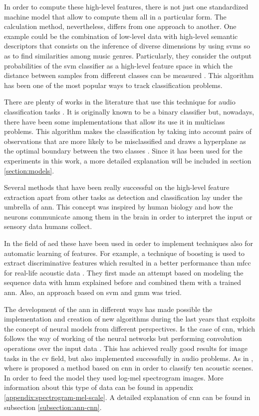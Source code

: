	In order to compute these high-level features, there is not just one standardized machine model that allow to compute them all in a particular form. The calculation method, nevertheless, differs from one approach to another. One example could be the combination of low-level data with high-level semantic descriptors that consists on the inference of diverse dimensions by using \acrlong{svm}s so as to find similarities among music genres. Particularly, they consider the output probabilities of the \acrshort{svm} classifier as a high-level feature space in which the distance between samples from different classes can be measured \cite{Bogdanov2011}. This algorithm has been one of the most popular ways to track classification problems.
	 
	There are plenty of works in the literature that use this technique for audio classification tasks \cite{Jiang2005} \cite{Geiger2013} \cite{Barchiesi2015}. It is originally known to be a binary classifier but, nowadays, there have been some implementations that allow its use it in multiclass problems. This algorithm makes the classification by taking into account pairs of observations that are more likely to be misclassified and draws a hyperplane as the optimal boundary between the two classes \cite{Fu2011}. Since it has been used for the experiments in this work, a more detailed explanation will be included in section \ref{section:models}.
	
	Several methods that have been really successful on the high-level feature extraction apart from other tasks as detection and classification lay under the umbrella of \acrfull{ann}. This concept was inspired by human biology and how the neurons communicate among them in the brain in order to interpret the input or sensory data humans collect. 
	
	In the field of \acrshort{aed} these have been used in order to implement techniques also for automatic learning of features. For example, a technique of boosting is used to extract discriminative features which resulted in a better performance than \acrshort{mfcc} for real-life acoustic data \cite{Zhuang2010}. They first made an attempt based on modeling the sequence data with \acrshort{hmm} explained before and combined them with a trained \acrshort{ann}. Also, an approach based on \acrshort{svm} and \acrshort{gmm} was tried. 
	
	The development of the \acrshort{ann} in different ways has made possible the implementation and creation of new algorithms during the last years that exploits the concept of neural models from different perspectives. Is the case of \acrfull{cnn}, which follows the way of working of the neural networks but performing convolution operations over the input data \cite{Fu2011}. This has achieved really good results for image tasks in the \acrlong{cv} field, but also implemented successfully in audio problems. As in \cite{Ren2018}, where is proposed a method based on \acrshort{cnn} in order to classify ten acoustic scenes. In order to feed the model they used log-mel spectrogram images. More information about this type of data can be found in appendix \ref{appendix:spectrogram-mel-scale}. A detailed explanation of \acrshort{cnn} can be found in subsection \ref{subsection:ann-cnn}.
	
